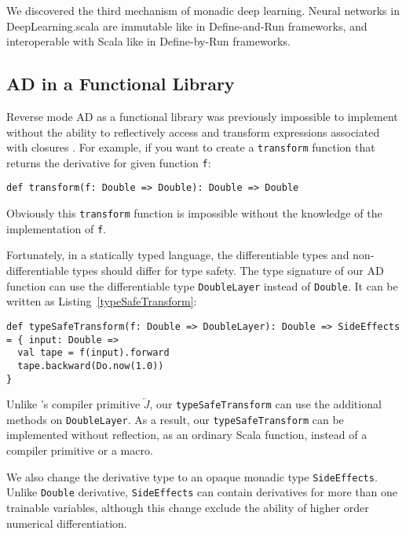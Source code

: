 We discovered the third mechanism of monadic deep learning. Neural networks in DeepLearning.scala are immutable like in Define-and-Run frameworks, and interoperable with Scala like in Define-by-Run frameworks.

\subsection{AD in a Functional Library}

Reverse mode AD as a functional library was previously impossible to implement without the ability to reflectively access and transform expressions associated with closures \cite{pearlmutter2008reverse}. For example, if you want to create a \lstinline{transform} function that returns the derivative for given function \lstinline{f}:

\begin{lstlisting}[float={h t b p},caption={Impossible transform function for AD}, label={transform}]
def transform(f: Double => Double): Double => Double
\end{lstlisting}

Obviously this \lstinline{transform} function is impossible without the knowledge of the implementation of \lstinline{f}.

Fortunately, in a statically typed language, the differentiable types and non-differentiable types should differ for type safety. The type signature of our AD function can use the differentiable type \lstinline{DoubleLayer} instead of \lstinline{Double}. It can be written as Listing~\ref{typeSafeTransform}:

\begin{lstlisting}[float={h t b p},caption={Type safe transform function for AD}, label={typeSafeTransform}]
def typeSafeTransform(f: Double => DoubleLayer): Double => SideEffects = { input: Double =>
  val tape = f(input).forward
  tape.backward(Do.now(1.0))
}
\end{lstlisting}

Unlike \cite{pearlmutter2008reverse}'s compiler primitive $\overleftarrow{J}$, our \lstinline{typeSafeTransform} can use the additional methods on \lstinline{DoubleLayer}. As a result, our \lstinline{typeSafeTransform} can be implemented without reflection, as an ordinary Scala function, instead of a compiler primitive or a macro.

We also change the derivative type to an opaque monadic type \lstinline{SideEffects}. Unlike \lstinline{Double} derivative, \lstinline{SideEffects} can contain derivatives for more than one \glspl{trainable variable}, although this change exclude the ability of higher order numerical differentiation.

